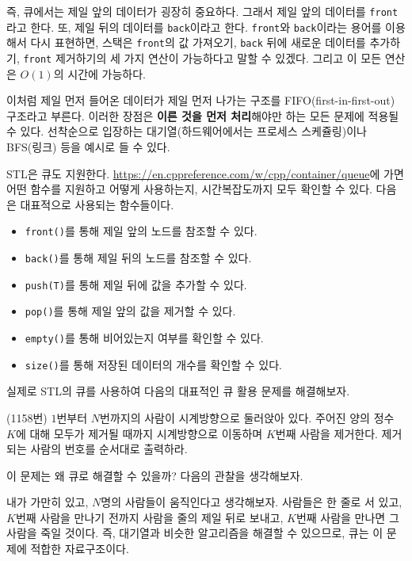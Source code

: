 즉, 큐에서는 제일 앞의 데이터가 굉장히 중요하다. 그래서 제일 앞의 데이터를 \texttt{front}라고 한다. 또, 제일 뒤의 데이터를 \texttt{back}이라고 한다. \texttt{front}와 \texttt{back}이라는 용어를 이용해서 다시 표현하면, 스택은 \texttt{front}의 값 가져오기, \texttt{back} 뒤에 새로운 데이터를 추가하기, \texttt{front} 제거하기의 세 가지 연산이 가능하다고 말할 수 있겠다. 그리고 이 모든 연산은 $O(1)$의 시간에 가능하다.

이처럼 제일 먼저 들어온 데이터가 제일 먼저 나가는 구조를 FIFO(first-in-first-out) 구조라고 부른다. 이러한 장점은 \textbf{이른 것을 먼저 처리}해야만 하는 모든 문제에 적용될 수 있다. 선착순으로 입장하는 대기열(하드웨어에서는 프로세스 스케쥴링)이나 BFS(링크) 등을 예시로 들 수 있다.

STL은 큐도 지원한다. \url{https://en.cppreference.com/w/cpp/container/queue}에 가면 어떤 함수를 지원하고 어떻게 사용하는지, 시간복잡도까지 모두 확인할 수 있다. 다음은 대표적으로 사용되는 함수들이다.

\begin{itemize}
    \item \texttt{front()}를 통해 제일 앞의 노드를 참조할 수 있다.
    \item \texttt{back()}를 통해 제일 뒤의 노드를 참조할 수 있다.
    \item \texttt{push(T)}를 통해 제일 뒤에 값을 추가할 수 있다.
    \item \texttt{pop()}를 통해 제일 앞의 값을 제거할 수 있다.
    \item \texttt{empty()}를 통해 비어있는지 여부를 확인할 수 있다.
    \item \texttt{size()}를 통해 저장된 데이터의 개수를 확인할 수 있다.
\end{itemize}

실제로 STL의 큐를 사용하여 다음의 대표적인 큐 활용 문제를 해결해보자.

\begin{example} \label{ex: queue}
    (1158번) $1$번부터 $N$번까지의 사람이 시계방향으로 둘러앉아 있다. 주어진 양의 정수 $K$에 대해 모두가 제거될 때까지 시계방향으로 이동하며 $K$번째 사람을 제거한다. 제거되는 사람의 번호를 순서대로 출력하라.
\end{example}

이 문제는 왜 큐로 해결할 수 있을까? 다음의 관찰을 생각해보자.

\begin{obs}
    내가 가만히 있고, $N$명의 사람들이 움직인다고 생각해보자. 사람들은 한 줄로 서 있고, $K$번째 사람을 만나기 전까지 사람을 줄의 제일 뒤로 보내고, $K$번째 사람을 만나면 그 사람을 죽일 것이다. 즉, 대기열과 비슷한 알고리즘을 해결할 수 있으므로, 큐는 이 문제에 적합한 자료구조이다.
\end{obs}

